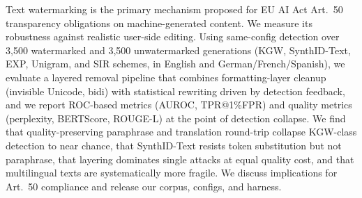 %

Text watermarking is the primary mechanism proposed for EU AI Act
Art.~50 transparency obligations on machine-generated content. We
measure its robustness against realistic user-side editing. Using
same-config detection over 3,500 watermarked and 3,500 unwatermarked
generations (KGW, SynthID-Text, EXP, Unigram, and SIR schemes, in
English and German/French/Spanish), we evaluate a layered removal
pipeline that combines formatting-layer cleanup (invisible Unicode,
bidi) with statistical rewriting driven by detection feedback, and we
report ROC-based metrics (AUROC, TPR@1\%FPR) and quality metrics
(perplexity, BERTScore, ROUGE-L) at the point of detection collapse. We
find that quality-preserving paraphrase and translation round-trip
collapse KGW-class detection to near chance, that SynthID-Text resists
token substitution but not paraphrase, that layering dominates single
attacks at equal quality cost, and that multilingual texts are
systematically more fragile. We discuss implications for Art.~50
compliance and release our corpus, configs, and harness.
